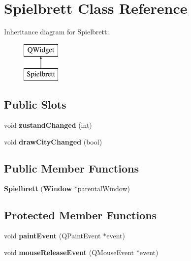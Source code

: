 \section{Spielbrett Class Reference}
\label{class_spielbrett}
Inheritance diagram for Spielbrett\-:\begin{figure}[H]
\begin{center}
\leavevmode
\includegraphics[height=2.000000cm]{class_spielbrett}
\end{center}
\end{figure}
\subsection*{Public Slots}
\begin{DoxyCompactItemize}
\item 
void {\bfseries zustand\-Changed} (int)\label{class_spielbrett_aff7bc25568c5caa1e5ba121a54b50489}

\item 
void {\bfseries draw\-City\-Changed} (bool)\label{class_spielbrett_a0ecee580d84ae3f99c20b13c9db929c9}

\end{DoxyCompactItemize}
\subsection*{Public Member Functions}
\begin{DoxyCompactItemize}
\item 
{\bfseries Spielbrett} ({\bf Window} $\ast$parental\-Window)\label{class_spielbrett_a55ccf1e51754aac00e74b8111e593f15}

\end{DoxyCompactItemize}
\subsection*{Protected Member Functions}
\begin{DoxyCompactItemize}
\item 
void {\bf paint\-Event} (Q\-Paint\-Event $\ast$event)
\item 
void {\bfseries mouse\-Release\-Event} (Q\-Mouse\-Event $\ast$event)\label{class_spielbrett_a17d3ac93220b92cdf404c4f91c0cb1de}

\end{DoxyCompactItemize}


